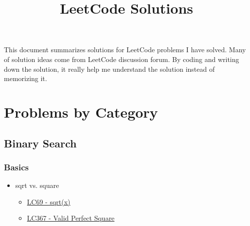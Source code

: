 \documentclass[justified]{tufte-book}
\title{LeetCode Solutions}
\newcommand{\blankpage}{\newpage\hbox{}\thispagestyle{empty}\newpage}
\begin{document}
\frontmatter

\blankpage

\maketitle

\tableofcontents
\listoffigures
\listoftables

\mainmatter
This document summarizes solutions for LeetCode problems I have solved. Many of solution ideas come from LeetCode discussion forum. By coding and writing down the solution, it really help me understand the solution instead of memorizing it.  

\chapter{Problems by Category}
\section{Binary Search}
\subsection{Basics}
\begin{itemize}
    \item sqrt vs. square
    \begin{itemize}
        \item \hyperref[sec:lc69_sqrt]{LC69 - sqrt(x)}
        \item \hyperref[sec:lc367_valid_perfect_square]{LC367 - Valid Perfect Square}
    \end{itemize}
\end{itemize}
\end{document}
